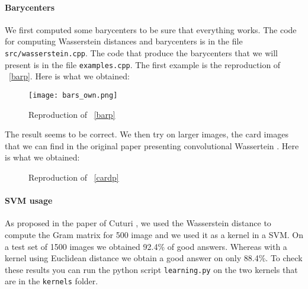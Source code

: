 \paragraph{Barycenters}
We first computed some barycenters to be sure that everything works. The code for computing Wasserstein distances and barycenters is in the file \verb|src/wasserstein.cpp|. The code that produce the barycenters that we will present is in the file \verb|examples.cpp|. The first example is the reproduction of \figurename~\ref{barp}. Here is what we obtained:

\begin{figure}[h]
	\centering
	\texttt{[image: bars\_own.png]}
	\caption{Reproduction of \figurename~\ref{barp}}
\end{figure}

The result seems to be correct. We then try on larger images, the card images that we can find in the original paper presenting convolutional Wassertein \cite{Goe++}. Here is what we obtained:

\begin{figure}[h]
	\centering
	\caption{Reproduction of \figurename~\ref{cardp}}
\end{figure}

\paragraph{SVM usage}
As proposed in the paper of Cuturi \cite{Cut}, we used the Wasserstein distance to compute the Gram matrix for 500 image and we used it as a kernel in a SVM. On a test set of 1500 images we obtained 92.4\% of good answers. Whereas with a kernel using Euclidean distance we obtain a good answer on only 88.4\%. To check these results you can run the python script \verb|learning.py| on the two kernels that are in the \verb|kernels| folder.